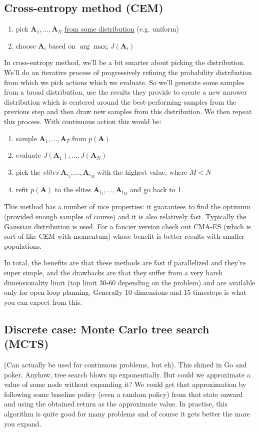 \documentclass{report}
\newcommand{\argmax}{\arg\!\max}
\begin{document}
\subsection{Cross-entropy method (CEM)}
\begin{enumerate}
		\item pick $\bm{A}_1, \dots, \bm{A}_N $ \underline{from some distribution} (e.g. uniform)
		\item choose $\bm{A}_i$ based on $\argmax_i J(\bm{A}_i)  $
\end{enumerate}
In cross-entropy method, we'll be a bit smarter about picking the distribution.
We'll do an iterative process of progressively refining the probability distribution from which we pick actions 
which we evaluate.
So we'll generate some samples from a broad distribution, use the results they provide to 
create a new narower distribution which is centered around the best-performing samples from the previous step
and then draw new samples from this distribution. We then repeat this process.
With continuous action this would be:
\begin{enumerate}
		\item sample $\bm{A}_1, \dots, \bm{A}_T $ from $p(\bm{A})$
		\item evaluate $J(\bm{A}_1), \dots, J(\bm{A}_N)$
		\item pick the \textit{elites} $\bm{A}_{i_1}, \dots, \bm{A}_{i_M} $ with the highest value, where $M < N$
		\item refit $p(\bm{A})$ to the elites $\bm{A}_{i_1}, \dots, \bm{A}_{i_M} $ and go back to 1.
\end{enumerate}
This method has a number of nice properties: it guarantees to find the optimum (provided enough samples of course)
and it is also relatively fast.
Typically the Gaussian distribution is used.
For a fancier version check out CMA-ES (which is sort of like CEM with momentum) whose benefit 
is better results with smaller populations.

In total, the benefits are that these methods are fast if parallelized and they're super simple, 
and the drawbacks are that they suffer from a very harsh dimensionality limit (top limit 30-60 depending on the problem)
and are available only for open-loop planning. Generally 10 dimensions and 15 timesteps is what you can expect from this.

\subsection{Discrete case: Monte Carlo tree search (MCTS)}
(Can actually be used for continuous problems, but eh).
This shined in Go and poker.
Anyhow, tree search blows up exponentially.
But could we approximate a value of some node without expanding it?
We could get that approximation by following some baseline policy (even a random policy) from that state onward 
and using the obtained return as the approximate value.
In practise, this algorithm is quite good for many problems and of course it gets better the more you expand.
\end{document}
